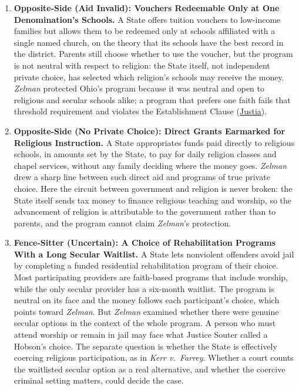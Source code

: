 \documentclass[12pt]{article}
\begin{document}
\begin{enumerate}
\item \textbf{Opposite-Side (Aid Invalid): Vouchers Redeemable Only at One Denomination's Schools.} A State offers tuition vouchers to low-income families but allows them to be redeemed only at schools affiliated with a single named church, on the theory that its schools have the best record in the district. Parents still choose whether to use the voucher, but the program is not neutral with respect to religion: the State itself, not independent private choice, has selected which religion's schools may receive the money. \textit{Zelman} protected Ohio's program because it was neutral and open to religious and secular schools alike; a program that prefers one faith fails that threshold requirement and violates the Establishment Clause (\href{https://supreme.justia.com/cases/federal/us/536/639/}{Justia}).

\item \textbf{Opposite-Side (No Private Choice): Direct Grants Earmarked for Religious Instruction.} A State appropriates funds paid directly to religious schools, in amounts set by the State, to pay for daily religion classes and chapel services, without any family deciding where the money goes. \textit{Zelman} drew a sharp line between such direct aid and programs of true private choice. Here the circuit between government and religion is never broken: the State itself sends tax money to finance religious teaching and worship, so the advancement of religion is attributable to the government rather than to parents, and the program cannot claim \textit{Zelman}'s protection.

\item \textbf{Fence-Sitter (Uncertain): A Choice of Rehabilitation Programs With a Long Secular Waitlist.} A State lets nonviolent offenders avoid jail by completing a funded residential rehabilitation program of their choice. Most participating providers are faith-based programs that include worship, while the only secular provider has a six-month waitlist. The program is neutral on its face and the money follows each participant's choice, which points toward \textit{Zelman}. But \textit{Zelman} examined whether there were genuine secular options in the context of the whole program. A person who must attend worship or remain in jail may face what Justice Souter called a Hobson's choice. The separate question is whether the State is effectively coercing religious participation, as in \textit{Kerr v.\ Farrey}. Whether a court counts the waitlisted secular option as a real alternative, and whether the coercive criminal setting matters, could decide the case.

\end{enumerate}
\end{document}
